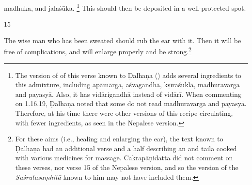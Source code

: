 \begin{translation}
        \gls{madhuka}, %
        and \gls{jalaśūka}.%
\footnote{The version of of this verse known to Ḍalhaṇa ()
            adds several ingredients to this admixture, including \gls{apāmārga},
            \gls{aśvagandhā}, \gls{kṣīraśuklā}, \gls{madhuravarga} and \gls{payasyā}.
            Also, it has \gls{vidārigandhā} instead of \gls{vidārī}. When commenting
            on 1.16.19, Ḍalhaṇa \citep[79]{vulgate} noted that some do not read
            \gls{madhuravarga} and \gls{payasyā}. Therefore, at his time there were
            other versions of this recipe circulating, with fewer ingredients, as seen
            in the Nepalese version.}
            This should then be deposited in a well-protected spot.
    

\smallskip
    
\item[15]%
    \begin{em}
The wise man who has been sweated should rub the  
ear with
it. Then it will be free of complications, and will enlarge properly and be
strong.\footnote{For these aims (i.e., healing and enlarging the ear), the text
    known to Ḍalhaṇa \citep[79]{vulgate} had an additional verse and a half describing
    an  and 
    \gls{taila} cooked
    with various medicines for massage. Cakrapāṇidatta \citep[131]{acar-1939} did not
    comment on these verses, nor verse 15 of the Nepalese version, and so the version
    of the \emph{Suśrutasaṃhitā} known to him may not have included them.}
    \end{em}
    

\end{translation}
